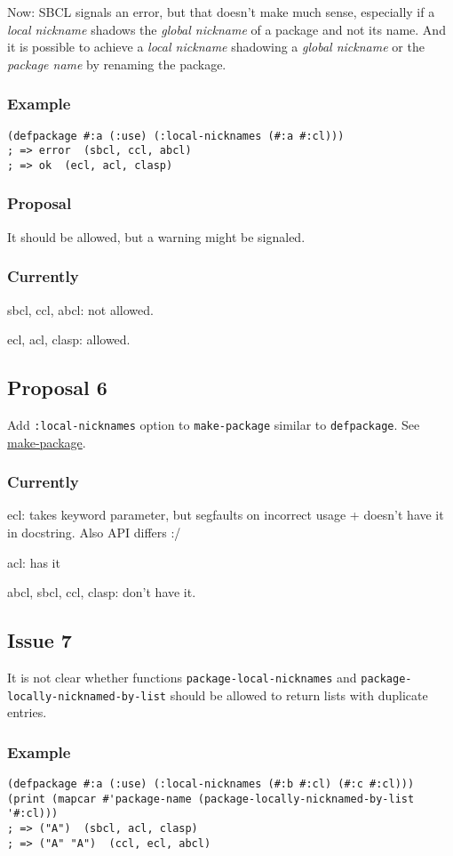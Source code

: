 \documentclass[11pt]{article}
\begin{document}
Now: SBCL signals an error, but that doesn't make much sense, especially if a
\emph{local nickname} shadows the \emph{global nickname} of a package and not its
name. And it is possible to achieve a \emph{local nickname} shadowing a \emph{global
nickname} or the \emph{package name} by renaming the package.
\subsubsection{Example}
\label{sec:org5c1c593}
\begin{verbatim}
(defpackage #:a (:use) (:local-nicknames (#:a #:cl)))
; => error  (sbcl, ccl, abcl)
; => ok  (ecl, acl, clasp)
\end{verbatim}
\subsubsection{Proposal}
\label{sec:orgb097be9}
It should be allowed, but a warning might be signaled.
\subsubsection{Currently}
\label{sec:orgaf67e1a}
sbcl, ccl, abcl: not allowed.

ecl, acl, clasp: allowed.
\subsection{Proposal 6}
\label{sec:org12812f0}
Add \texttt{:local-nicknames} option to \texttt{make-package} similar to \texttt{defpackage}. See
\hyperref[sec:orgce30ef8]{make-package}.
\subsubsection{Currently}
\label{sec:org7bf1441}
ecl: takes keyword parameter, but segfaults on incorrect usage + doesn't
have it in docstring. Also API differs :/

acl: has it

abcl, sbcl, ccl, clasp: don't have it.
\subsection{Issue 7}
\label{sec:org2adb8da}
It is not clear whether functions \texttt{package-local-nicknames} and
\texttt{package-locally-nicknamed-by-list} should be allowed to return lists with
duplicate entries.
\subsubsection{Example}
\label{sec:org7fba130}
\begin{verbatim}
(defpackage #:a (:use) (:local-nicknames (#:b #:cl) (#:c #:cl)))
(print (mapcar #'package-name (package-locally-nicknamed-by-list '#:cl)))
; => ("A")  (sbcl, acl, clasp)
; => ("A" "A")  (ccl, ecl, abcl)
\end{verbatim}
\end{document}
